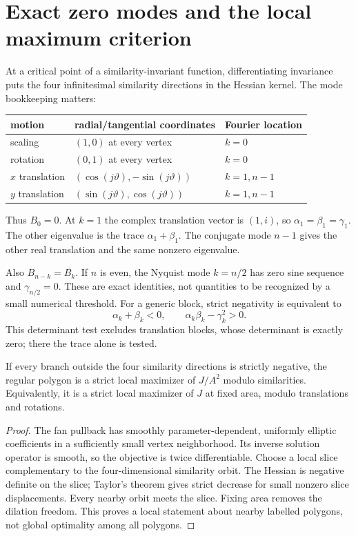 \section{Exact zero modes and the local maximum criterion}
\label{l1:zeros}
At a critical point of a similarity-invariant function, differentiating
invariance puts the four infinitesimal similarity directions in the Hessian
kernel. The mode bookkeeping matters:
\begin{center}
\begin{tabular}{lll}\toprule
motion & radial/tangential coordinates & Fourier location\\\midrule
scaling & $(1,0)$ at every vertex & $k=0$\\
rotation & $(0,1)$ at every vertex & $k=0$\\
$x$ translation & $(\cos(j\vartheta),-\sin(j\vartheta))$ & $k=1,n-1$\\
$y$ translation & $(\sin(j\vartheta),\cos(j\vartheta))$ & $k=1,n-1$\\\bottomrule
\end{tabular}
\end{center}
Thus $B_0=0$. At $k=1$ the complex translation vector is $(1,i)$, so
$\alpha_1=\beta_1=\gamma_1$. The other eigenvalue is the trace
$\alpha_1+\beta_1$. The conjugate mode $n-1$ gives the other real
translation and the same nonzero eigenvalue.

Also $B_{n-k}=\overline{B_k}$. If $n$ is even, the Nyquist mode $k=n/2$
has zero sine sequence and $\gamma_{n/2}=0$. These are exact identities,
not quantities to be recognized by a small numerical threshold.
For a generic block, strict negativity is equivalent to
\[
 \alpha_k+\beta_k<0,\qquad \alpha_k\beta_k-\gamma_k^2>0.
\]
This determinant test excludes translation blocks, whose determinant is
exactly zero; there the trace alone is tested.

\begin{theorem}
If every branch outside the four similarity directions is strictly
negative, the regular polygon is a strict local maximizer of $J/A^2$
modulo similarities. Equivalently, it is a strict local maximizer of $J$
at fixed area, modulo translations and rotations.
\end{theorem}
\begin{proof}
The fan pullback has smoothly parameter-dependent, uniformly elliptic
coefficients in a sufficiently small vertex neighborhood. Its inverse
solution operator is smooth, so the objective is twice differentiable.
Choose a local slice complementary to the four-dimensional similarity
orbit. The Hessian is negative definite on the slice; Taylor's theorem
gives strict decrease for small nonzero slice displacements. Every nearby
orbit meets the slice. Fixing area removes the dilation freedom.
This proves a local statement about nearby labelled polygons, not global
optimality among all polygons.
\end{proof}

